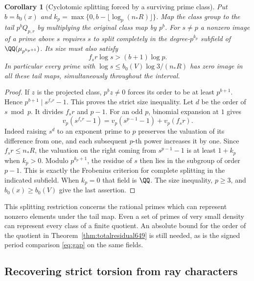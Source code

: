 \documentclass[a4paper,11pt]{article}
\newtheorem{corollary}[proposition]{Corollary}
\theoremstyle{definition}
\theoremstyle{remark}
\numberwithin{equation}{section}
\begin{document}
\begin{corollary}[Cyclotomic splitting forced by a surviving prime class]
\leavevmode\label{cor:detectingsplit650}
Put \(b=b_0(x)\) and
\(k_p=\max\{0,b-\lfloor\log_p(n_*R)\rfloor\}\).
Map the class group to the tail \(p^bQ_{p,r}\) by multiplying
the original class map by \(p^b\). For \(s\ne p\) a nonzero
image of a prime above \(s\) requires \(s\) to split
completely in the degree-\(p^{k_p}\) subfield of
\(\QQ(\mu_{p^{k_p+1}})\). Its size must also satisfy
\[
                f_s r\log s>(b+1)\log p.
\]
In particular every prime with \(\log s\le
b_0(V)\log 3/(n_*R)\) has zero image in all these tail
maps, simultaneously throughout the interval.
\end{corollary}
\begin{proof}
If \(z\) is the projected class, \(p^b z\ne0\) forces its
order to be at least \(p^{b+1}\). Hence
\(p^{b+1}\mid s^{f_s r}-1\). This proves the strict size
inequality. Let \(d\) be the order of \(s\bmod p\). It
divides \(f_s r\) and \(p-1\). For an odd \(p\), binomial
expansion at \(1\) gives
\[
 v_p(s^{f_s r}-1)
    =v_p(s^{p-1}-1)+v_p(f_s r).
\]
Indeed raising \(s^d\) to an exponent prime to \(p\)
preserves the valuation of its difference from one, and
each subsequent \(p\)-th power increases it by one.
Since \(f_s r\le n_*R\), the valuation on the right coming
from \(s^{p-1}-1\) is at least \(1+k_p\) when \(k_p>0\).
Modulo \(p^{k_p+1}\), the residue of \(s\) then lies in the
subgroup of order \(p-1\). This is exactly the Frobenius
criterion for complete splitting in the indicated subfield.
When \(k_p=0\) that field is \(\QQ\). The size inequality,
\(p\ge3\), and \(b_0(x)\ge b_0(V)\) give the last assertion.
\end{proof}

This splitting restriction concerns the rational primes
which can represent nonzero elements under the tail map.
Even a set of primes of very small density can represent
every class of a finite quotient. An absolute bound for the
order of the quotient in Theorem~\ref{thm:totalresidual649}
is still needed, as is the signed period comparison
\eqref{eq:gap} on the same fields.


\subsection{Recovering strict torsion from ray characters}
\label{sec:raylength656}
\end{document}
